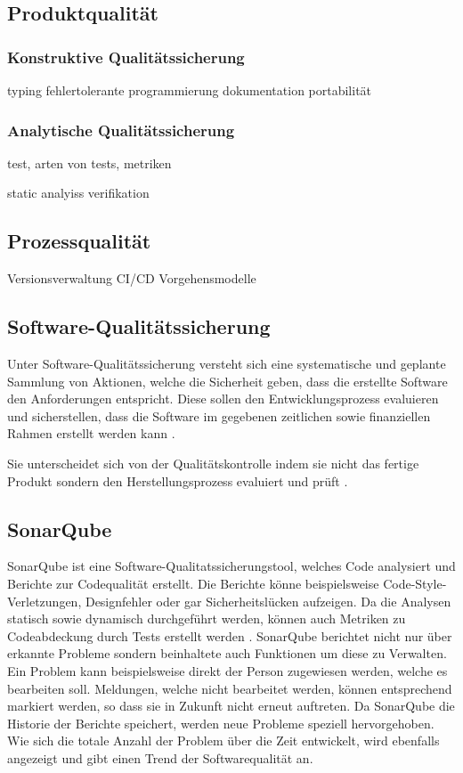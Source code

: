 \subsection{Produktqualität}

\subsubsection{Konstruktive Qualitätssicherung}
typing
fehlertolerante programmierung
dokumentation
portabilität
\subsubsection{Analytische Qualitätssicherung}
test, arten von tests, metriken

static analyiss
verifikation


\subsection{Prozessqualität}
Versionsverwaltung
CI/CD
Vorgehensmodelle



\subsection{Software-Qualitätssicherung}
Unter Software-Qualitätssicherung versteht sich eine systematische und geplante Sammlung von Aktionen, 
welche die Sicherheit geben, dass die erstellte Software den Anforderungen entspricht.
Diese sollen den Entwicklungsprozess evaluieren und sicherstellen,
dass die Software im gegebenen zeitlichen sowie finanziellen Rahmen erstellt werden kann \parencite{galin2004software}. 

Sie unterscheidet sich von der Qualitätskontrolle indem sie nicht das fertige Produkt sondern den Herstellungsprozess evaluiert und prüft \parencite{galin2004software}.


\subsection{SonarQube}\label{quality:sonar}
SonarQube ist eine Software-Qualitatssicherungstool, welches Code analysiert und Berichte zur Codequalität erstellt.
Die Berichte könne beispielsweise Code-Style-Verletzungen, Designfehler oder gar Sicherheitslücken aufzeigen.
Da die Analysen statisch sowie dynamisch durchgeführt werden, können auch Metriken zu Codeabdeckung durch Tests erstellt werden \parencite{malloy_2021}.
SonarQube berichtet nicht nur über erkannte Probleme sondern beinhaltete auch Funktionen um diese zu Verwalten.
Ein Problem kann beispielsweise direkt der Person zugewiesen werden, welche es bearbeiten soll.
Meldungen, welche nicht bearbeitet werden, können entsprechend markiert werden, so dass sie in Zukunft nicht erneut auftreten.
Da SonarQube die Historie der Berichte speichert, werden neue Probleme speziell hervorgehoben.
Wie sich die totale Anzahl der Problem über die Zeit entwickelt, wird ebenfalls angezeigt und gibt einen Trend der Softwarequalität an.

